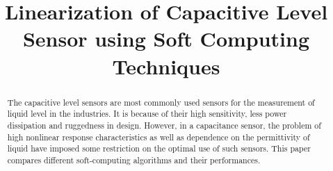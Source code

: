 \documentclass[conference]{IEEEtran}
\begin{document}
%
\title{Linearization of Capacitive Level Sensor using Soft Computing Techniques}


\author{
\and
{}
}

\maketitle

\begin{abstract}
The  capacitive  level  sensors  are  most  commonly  used  sensors  for  the  measurement  of  liquid level in  the  industries. It  is  because  of  their  high  sensitivity,  less  power  dissipation  and ruggedness in design. However, in a capacitance sensor, the problem of high nonlinear response characteristics as well as dependence on the permittivity of liquid have imposed some restriction on the optimal use of such sensors. This paper compares different soft-computing algorithms and their performances. 

\end{abstract}





%
\IEEEpeerreviewmaketitle
\end{document}
